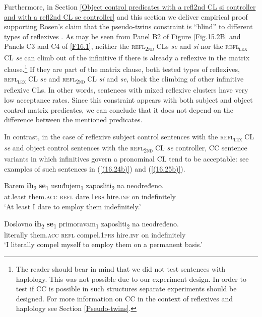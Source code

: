 Furthermore, in Section \ref{Object control predicates with a refl2nd CL si controller and with a refl2nd CL se controller} and this section we deliver empirical proof supporting Rosen’s claim that the pseudo-twins constraint is “blind” to different types of reflexives \citep[cf.][104]{Rosen14}. As may be seen from Panel B2 of Figure \ref{Fig.15.2B} and Panels C3 and C4 of \ref{F16.1}, neither the \textsc{refl\textsubscript{2nd}} CLs \textit{se} and \textit{si} nor the \textsc{refl\textsubscript{\textsc{lex}}} CL \textit{se} can climb out of the infinitive if there is already a reflexive in the matrix clause.\footnote{The reader should bear in mind that we did not test sentences with haplology. This was not possible due to our experiment design. In order to test if CC is possible in such structures separate experiments should be designed. For more information on CC in the context of reflexives and haplology see Section \ref{Pseudo-twins}.} If they are part of the matrix clause, both tested types of reflexives, \textsc{refl\textsubscript{\textsc{lex}}} CL \textit{se} and \textsc{refl\textsubscript{2nd}} CL \textit{si} and \textit{se}, block the climbing of other infinitive reflexive CLs. In other words, sentences with mixed reflexive clusters have very low acceptance rates. Since this constraint appears with both subject and object control matrix predicates, we can conclude that it does not depend on the difference between the mentioned predicates.

In contrast, in the case of reflexive subject control sentences with the \textsc{refl\textsubscript{\textsc{lex}}} CL \textit{se} and object control sentences with the \textsc{refl\textsubscript{2nd}} CL \textit{se} controller, CC sentence variants in which infinitives govern a pronominal CL tend to be acceptable: see examples of such sentences in (\ref{(16.24b)}) and (\ref{(16.25b)}). 

\begin{exe}
\ex\label{(16.24b)}
\gll Barem \textbf{ih}\textsubscript{2} \textbf{se}\textsubscript{1} usuđujem\textsubscript{1} zaposliti\textsubscript{2} na neodređeno.\\
 at.least them.\textsc{acc} \textsc{refl} dare.1\textsc{prs} hire.\textsc{inf} on indefinitely\\
\glt ‘At least I dare to employ them indefinitely.’

\ex\label{(16.25b)}
\gll Doslovno \textbf{ih}\textsubscript{2} \textbf{se}\textsubscript{1} primoravam\textsubscript{1} zaposliti\textsubscript{2} na neodređeno.\\
 literally them.\textsc{acc} \textsc{refl} compel.1\textsc{prs} hire.\textsc{inf} on indefinitely\\
\glt ‘I literally compel myself to employ them on a permanent basis.’ 
\end{exe}
 
